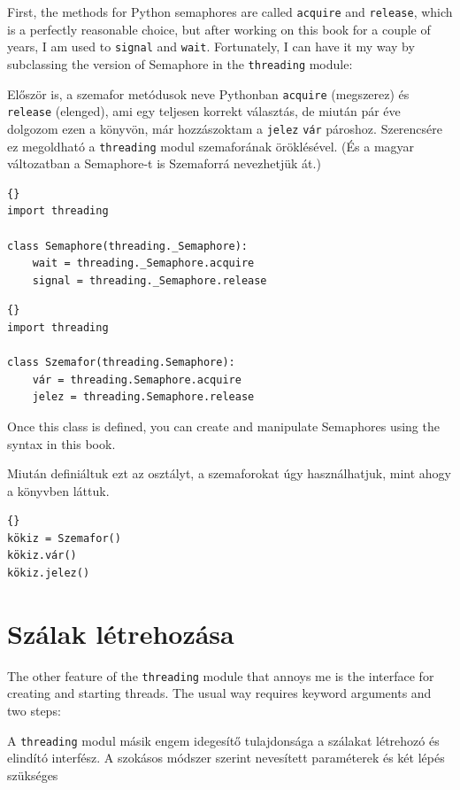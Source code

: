 \documentclass{book}
\begin{document}
First, the methods for Python semaphores are called {\tt acquire}
and {\tt release}, which is a perfectly reasonable choice, but
after working on this book for a couple of years, I am used
to {\tt signal} and {\tt wait}.  Fortunately, I can have it
my way by subclassing the version of Semaphore in the
{\tt threading} module:

Először is, a szemafor metódusok neve Pythonban {\tt acquire} (megszerez)
és {\tt release} (elenged), ami egy teljesen korrekt választás,
de miután pár éve dolgozom ezen a könyvön, már hozzászoktam
a {\tt jelez} {\tt vár} pároshoz. Szerencsére ez megoldható
a {\tt threading} modul szemaforának öröklésével. (És a magyar
változatban a Semaphore-t is Szemaforrá nevezhetjük át.)

\begin{lstlisting}[title={Semaphore name change}]{}
import threading
 
class Semaphore(threading._Semaphore):
    wait = threading._Semaphore.acquire
    signal = threading._Semaphore.release
\end{lstlisting}

\begin{lstlisting}[title={Szemafor névváltoztatás}]{}
import threading
 
class Szemafor(threading.Semaphore):
    vár = threading.Semaphore.acquire
    jelez = threading.Semaphore.release
\end{lstlisting}

Once this class is defined, you can create and manipulate Semaphores
using the syntax in this book.

Miután definiáltuk ezt az osztályt, a szemaforokat
úgy használhatjuk, mint ahogy a könyvben láttuk.

\begin{lstlisting}[title={Szemafor példa}]{}
kökiz = Szemafor()
kökiz.vár()
kökiz.jelez()
\end{lstlisting}

\section{Szálak létrehozása}

The other feature of the {\tt threading} module that annoys
me is the interface for creating and starting threads.  The
usual way requires keyword arguments and two steps:

A {\tt threading} modul másik engem idegesítő tulajdonsága
a szálakat létrehozó és elindító interfész.
A szokásos módszer szerint nevesített paraméterek és két lépés
szükséges
\end{document}
